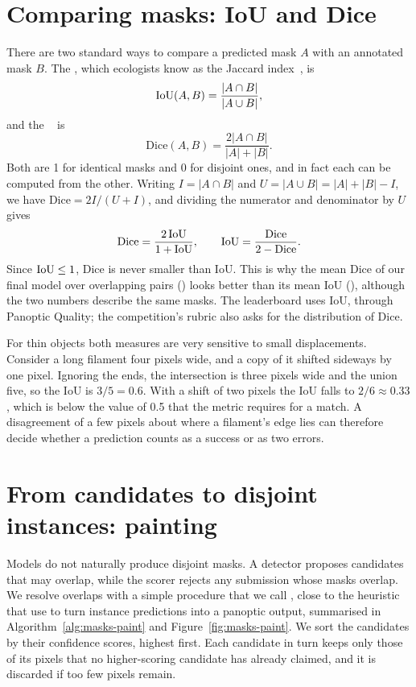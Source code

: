 \section{Comparing masks: IoU and Dice}\label{sec:masks-iou}
There are two standard ways to compare a predicted mask $A$ with an annotated mask $B$. The
, which ecologists know as the Jaccard index~\citep{jaccard1912},
is
\begin{equation}
\mathrm{IoU}(A,B)=\frac{|A\cap B|}{|A\cup B|},
\end{equation}
and the ~\citep{dice1945} is
\begin{equation}
\mathrm{Dice}(A,B)=\frac{2|A\cap B|}{|A|+|B|}.
\end{equation}
Both are 1 for identical masks and 0 for disjoint ones, and in fact each can be computed from the
other. Writing $I=|A\cap B|$ and $U=|A\cup B|=|A|+|B|-I$, we have $\mathrm{Dice}=2I/(U+I)$, and
dividing the numerator and denominator by $U$ gives
\begin{equation}
\mathrm{Dice}=\frac{2\,\mathrm{IoU}}{1+\mathrm{IoU}},\qquad \mathrm{IoU}=\frac{\mathrm{Dice}}{2-\mathrm{Dice}}.
\label{eq:masks-dice-iou}
\end{equation}
Since $\mathrm{IoU}\le1$, Dice is never smaller than IoU. This is why the mean Dice of our final model
over overlapping pairs (\MeanDiceOverlap{}) looks better than its mean IoU (\MeanIoUOverlap{}),
although the two numbers describe the same masks. The leaderboard uses IoU, through Panoptic
Quality; the competition's rubric also asks for the distribution of Dice.

For thin objects both measures are very sensitive to small displacements. Consider a long filament
four pixels wide, and a copy of it shifted sideways by one pixel. Ignoring the ends, the
intersection is three pixels wide and the union five, so the IoU is $3/5=0.6$. With a shift of two
pixels the IoU falls to $2/6\approx0.33$, which is below the value of 0.5 that the metric requires
for a match. A disagreement of a few pixels about where a filament's edge lies can therefore decide
whether a prediction counts as a success or as two errors.

\section{From candidates to disjoint instances: painting}\label{sec:masks-paint}
Models do not naturally produce disjoint masks. A detector proposes candidates that may overlap,
while the scorer rejects any submission whose masks overlap. We resolve overlaps with a simple
procedure that we call , close to the heuristic that \citet{pq} use to turn
instance predictions into a panoptic output, summarised in Algorithm~\ref{alg:masks-paint} and
Figure~\ref{fig:masks-paint}. We sort the candidates by their confidence scores, highest first.
Each candidate in turn keeps only those of its pixels that no higher-scoring candidate has already
claimed, and it is discarded if too few pixels remain.


